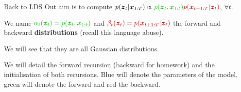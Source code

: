 \documentclass{beamer}
\newcommand{\bs}[1]{\boldsymbol{#1}}
\begin{document}
\begin{frame}{Back to LDS}
  Out aim is to compute $p(\bs{z}_t|\bs{x}_{1:T})\propto {\color{mygreen}p(\bs{z}_t,\bs{x}_{1:t})}{\color{myred}p(\bs{x}_{t+1:T}|\bs{z}_t)}$, $\forall t$.\vspace{5mm}

  We name ${\color{mygreen}\alpha_t(\bs{z}_t)=p(\bs{z}_t,\bs{x}_{1:t})}$ and ${\color{myred}\beta_t(\bs{z}_t)=p(\bs{x}_{t+1:T}|\bs{z}_t)}$ the forward and backward \textbf{distributions} (recall this language abuse).\vspace{5mm}
  
  We will see that they are all Gaussian distributions.\vspace{5mm}
  
  We will detail the forward recursion (backward for homework) and the initialisation of both recursions. \textcolor{myblue}{Blue will denote the parameters of the model}, \textcolor{mygreen}{green will denote the forward} and \textcolor{myred}{red the backward}.
\end{frame}
\end{document}
